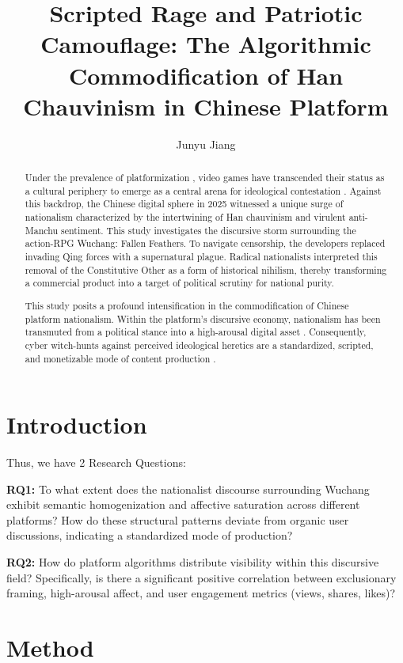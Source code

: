 \documentclass[letterpaper]{article}
\title{Scripted Rage and Patriotic Camouflage: The Algorithmic Commodification of Han Chauvinism in Chinese Platform}
\author{
    Junyu Jiang
}
\begin{document}
\maketitle

\begin{abstract}
Under the prevalence of platformization \citep{nieborg2018}, video games have transcended their status as a cultural periphery to emerge as a central arena for ideological contestation \citep{dyer2009}. Against this backdrop, the Chinese digital sphere in 2025 witnessed a unique surge of nationalism characterized by the intertwining of Han chauvinism and virulent anti-Manchu sentiment. This study investigates the discursive storm surrounding the action-RPG Wuchang: Fallen Feathers. To navigate censorship, the developers replaced invading Qing forces with a supernatural plague. Radical nationalists interpreted this removal of the Constitutive Other \citep{hall1996,schmitt1996} as a form of historical nihilism, thereby transforming a commercial product into a target of political scrutiny for national purity.

This study posits a profound intensification in the commodification of Chinese platform nationalism. Within the platform's discursive economy, nationalism has been transmuted from a political stance into a high-arousal digital asset \citep{papacharissi2016}. Consequently, cyber witch-hunts against perceived ideological heretics are a standardized, scripted, and monetizable mode of content production \citep{ritzer2010}.
\end{abstract}

\section{Introduction}

Thus, we have 2 Research Questions:

\textbf{RQ1:} To what extent does the nationalist discourse surrounding Wuchang exhibit semantic homogenization and affective saturation across different platforms? How do these structural patterns deviate from organic user discussions, indicating a standardized mode of production?

\textbf{RQ2:} How do platform algorithms distribute visibility within this discursive field? Specifically, is there a significant positive correlation between exclusionary framing, high-arousal affect, and user engagement metrics (views, shares, likes)?

\section{Method}
\end{document}
